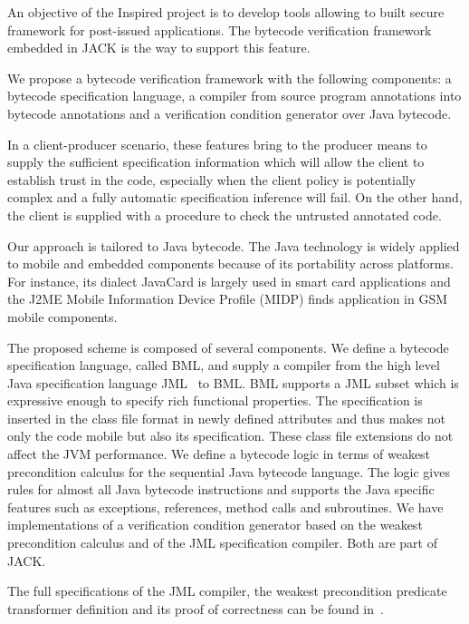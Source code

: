 An objective of the Inspired project is to develop tools allowing to built secure framework for post-issued applications. The bytecode verification framework embedded in JACK is the way to support this feature.  

We propose a bytecode verification framework with the following components: a bytecode specification language, a compiler from source
 program annotations into bytecode annotations and a verification condition generator over Java bytecode.

In a client-producer scenario, these features bring to the producer means to supply the sufficient specification information 
which will allow the client to establish trust in the code, especially when the client policy is potentially complex and a fully automatic specification inference
will fail. On the other hand, the client is supplied with a procedure to check the untrusted annotated code. 

  

Our approach is tailored to Java bytecode.
The Java technology is widely applied to mobile and embedded components because of its portability across platforms. 
For instance, its dialect JavaCard is largely used in smart card applications and the J2ME Mobile Information Device Profile 
(MIDP) finds application in GSM mobile components. 

The proposed scheme is composed of several components.
 We define a bytecode specification language, called BML, and supply a compiler from 
 the high level Java specification language JML~\cite{JMLRefMan} to BML. 
 BML supports a JML subset which is expressive enough to specify rich functional properties. 
The specification is inserted in the class file format in newly defined attributes and thus makes not
 only the code mobile but also its specification. These class
 file extensions do not affect the JVM performance.
We define a bytecode logic in terms of weakest precondition calculus for the sequential Java bytecode language. 
The logic gives rules for almost all Java bytecode instructions and supports the Java specific features such as
exceptions, references, method calls and subroutines.  
 We have implementations of a verification condition generator based on the weakest precondition calculus and of
 the JML specification compiler. Both are part of JACK.

  The full specifications of the JML compiler, the weakest precondition predicate transformer definition and its proof of correctness can be found in~\cite{JBL05MP}.
  
